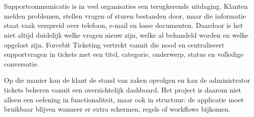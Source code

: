 ﻿%

\chapter{}%
\label{ch:inleiding}

%

Supportcommunicatie is in veel organisaties een terugkerende uitdaging. Klanten melden problemen, stellen vragen of sturen bestanden door, maar die informatie staat vaak verspreid over telefoon, e-mail en losse documenten. Daardoor is het niet altijd duidelijk welke vragen nieuw zijn, welke al behandeld worden en welke opgelost zijn. Forcebit Ticketing vertrekt vanuit die nood en centraliseert supportvragen in tickets met een titel, categorie, onderwerp, status en volledige conversatie.

Op die manier kan de klant de stand van zaken opvolgen en kan de administrator tickets beheren vanuit een overzichtelijk dashboard. Het project is daarom niet alleen een oefening in functionaliteit, maar ook in structuur: de applicatie moet bruikbaar blijven wanneer er extra schermen, regels of workflows bijkomen.

\section{}%
\label{sec:probleemstelling}

